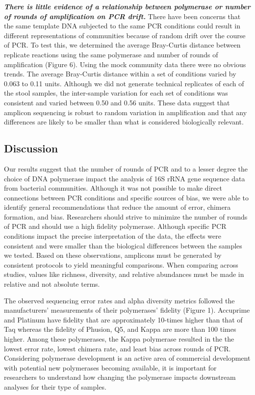 \documentclass[11pt,]{article}
\begin{document}
\textbf{\emph{There is little evidence of a relationship between
polymerase or number of rounds of amplification on PCR drift.}} There
have been concerns that the same template DNA subjected to the same PCR
conditions could result in different representations of communities
because of random drift over the course of PCR. To test this, we
determined the average Bray-Curtis distance between replicate reactions
using the same polymerase and number of rounds of amplification (Figure
6). Using the mock community data there were no obvious trends. The
average Bray-Curtis distance within a set of conditions varied by 0.063
to 0.11 units. Although we did not generate technical replicates of each
of the stool samples, the inter-sample variation for each set of
conditions was consistent and varied between 0.50 and 0.56 units. These
data suggest that amplicon sequencing is robust to random variation in
amplification and that any differences are likely to be smaller than
what is considered biologically relevant.

\newpage

\hypertarget{discussion}{%
\subsection{Discussion}\label{discussion}}

Our results suggest that the number of rounds of PCR and to a lesser
degree the choice of DNA polymerase impact the analysis of 16S rRNA gene
sequence data from bacterial communities. Although it was not possible
to make direct connections between PCR conditions and specific sources
of bias, we were able to identify general recommendations that reduce
the amount of error, chimera formation, and bias. Researchers should
strive to minimize the number of rounds of PCR and should use a high
fidelity polymerase. Although specific PCR conditions impact the precise
interpretation of the data, the effects were consistent and were smaller
than the biological differences between the samples we tested. Based on
these observations, amplicons must be generated by consistent protocols
to yield meaningful comparisons. When comparing across studies, values
like richness, diversity, and relative abundances must be made in
relative and not absolute terms.

The observed sequencing error rates and alpha diversity metrics followed
the manufacturers' measurements of their polymerases' fidelity (Figure
1). Accuprime and Platinum have fidelity that are approximately 10-times
higher than that of Taq whereas the fidelity of Phusion, Q5, and Kappa
are more than 100 times higher. Among these polymerases, the Kappa
polymerase resulted in the the lowest error rate, lowest chimera rate,
and least bias across rounds of PCR. Considering polymerase development
is an active area of commercial development with potential new
polymerases becoming available, it is important for researchers to
understand how changing the polymerase impacts downstream analyses for
their type of samples.
\end{document}
